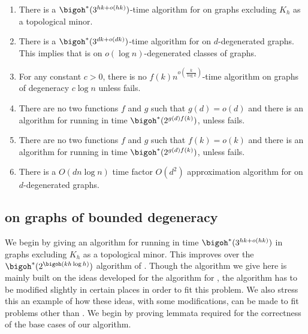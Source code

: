\begin{enumerate}
\item There is a $\bigoh^*(3^{hk+o(hk)})$-time algorithm for \ds{} on graphs excluding $K_h$ as a topological minor.
\item There is a $\bigoh^*(3^{dk+o(dk)})$-time algorithm for \ds{} on $d$-degenerated graphs. This implies that \ds{} is \FPT{} on $o(\log n)$-degenerated classes of graphs.
\item For any constant $c>0$, there is no $f(k)n^{o({\frac k {\log k} })}$-time algorithm on graphs of degeneracy $c \log n$ unless {\ETH} fails.
\item  There are no two functions $f$ and $g$ such that $g(d)=o(d)$ and there is an algorithm for {\ds} running in time $\bigoh^*(2^{g(d)f(k)})$, unless {\ETH} fails.
\item  There are no two functions $f$ and $g$ such that $f(k)=o(k)$ and there is an algorithm for {\ds} running in time $\bigoh^*(2^{g(d)f(k)})$, unless {\ETH} fails.
\item There is a $O(dn\log n)$ time factor $O(d^2)$ approximation algorithm for {\ds} on $d$-degenerated graphs.
\end{enumerate}

\subsection{{\ds} on graphs of bounded degeneracy}

We begin by giving an algorithm for {\ds} running in time $\bigoh^*(3^{hk+o(hk)})$ in graphs excluding $K_h$ as a topological minor. This improves over the $\bigoh^*(2^{\bigoh(kh \log h)})$ algorithm of \cite{AlonG09}. Though the algorithm we give here is mainly built on the ideas developed for the algorithm for {\dst}, the algorithm has to be modified slightly in certain places in order to fit this problem. We also stress this an example of how these ideas, with some modifications, can be made to fit problems other than {\dst}. We begin by proving lemmata required for the correctness of the base cases of our algorithm.


